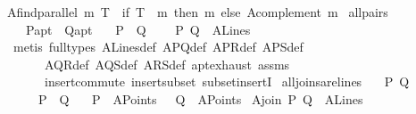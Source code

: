 \begin{isabellebody}
{\isachardoublequoteopen}A{}find{\isacharunderscore}{\kern0pt}parallel\ m\ T\ {\isacharequal}{\kern0pt}\ {\isacharparenleft}{\kern0pt}if\ T\ {\isasymin}\ m\ then\ m\ else\ {\isacharparenleft}{\kern0pt}A{}complement\ m{\isacharparenright}{\kern0pt}{\isacharparenright}{\kern0pt}{\isachardoublequoteclose}\isanewline
\isanewline
{}\isamarkupfalse%
\ all{\isacharunderscore}{\kern0pt}pairs{\isacharcolon}{\kern0pt}\isanewline
\ \ \ P{\isacharcolon}{\kern0pt}{\isacharcolon}{\kern0pt}a{}pt\ \ Q{\isacharcolon}{\kern0pt}{\isacharcolon}{\kern0pt}a{}pt\isanewline
\ \ \ {\isachardoublequoteopen}P\ {\isasymnoteq}\ Q{\isachardoublequoteclose}\ \isanewline
\ \ \ {\isachardoublequoteopen}{\isacharbraceleft}{\kern0pt}P{\isacharcomma}{\kern0pt}\ Q{\isacharbraceright}{\kern0pt}\ {\isasymin}\ A{}Lines{\isachardoublequoteclose}\isanewline
%
\isadelimproof
\ \ %
\endisadelimproof
%
\isatagproof
{}\isamarkupfalse%
\ {\isacharparenleft}{\kern0pt}metis\ {\isacharparenleft}{\kern0pt}full{\isacharunderscore}{\kern0pt}types{\isacharparenright}{\kern0pt}\ A{}Lines{\isacharunderscore}{\kern0pt}def\ A{}PQ{\isacharunderscore}{\kern0pt}def\ A{}PR{\isacharunderscore}{\kern0pt}def\ A{}PS{\isacharunderscore}{\kern0pt}def\ \isanewline
\ \ \ \ \ \ A{}QR{\isacharunderscore}{\kern0pt}def\ A{}QS{\isacharunderscore}{\kern0pt}def\ A{}RS{\isacharunderscore}{\kern0pt}def\ a{}pt{\isachardot}{\kern0pt}exhaust\ assms\ \isanewline
\ \ \ \ \ \ insert{\isacharunderscore}{\kern0pt}commute\ insert{\isacharunderscore}{\kern0pt}subset\ subset{\isacharunderscore}{\kern0pt}insertI{\isacharparenright}{\kern0pt}%
\endisatagproof
{\isafoldproof}%
%
\isadelimproof
\isanewline
%
\endisadelimproof
\isanewline
{}\isamarkupfalse%
\ all{\isacharunderscore}{\kern0pt}joins{\isacharunderscore}{\kern0pt}are{\isacharunderscore}{\kern0pt}lines{\isacharcolon}{\kern0pt}\isanewline
\ \ \ P\ Q\isanewline
\ \ \ \ \ {\isachardoublequoteopen}P\ {\isasymnoteq}\ Q{\isachardoublequoteclose}\ \isanewline
\ \ {\isachardoublequoteopen}P\ {\isasymin}\ A{}Points{\isachardoublequoteclose}\ \ \ Q\ {\isasymin}\ A{}Points{\isachardoublequoteclose}\isanewline
{}\ {\isachardoublequoteopen}A{}join\ P\ Q\ {\isasymin}\ A{}Lines{\isachardoublequoteclose}\isanewline

\end{isabellebody}
